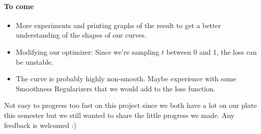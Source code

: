 \documentclass[11pt]{article}
\begin{document}
\paragraph*{To come}
\begin{itemize}
  \item More experiments and printing graphs of the result to get a better understanding of the shapes of our curves. 
  \item Modifying our optimizer: Since we're sampling $t$ between 0 and 1, the loss can be unstable.
  \item The curve is probably highly non-smooth. Maybe experience with some Smoothness Regularizers that we would add to the loss function.
\end{itemize}

Not easy to progress too fast on this project since we both have a lot on our plate this semester but we still wanted to share the little progress we made. Any feedback is welcomed :)
\end{document}

